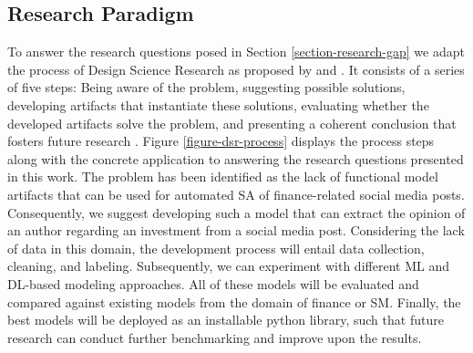 \subsection{Research Paradigm}

To answer the research questions posed in Section \ref{section-research-gap} we adapt the process of Design Science Research as proposed by  and . It consists of a series of five steps: Being aware of the problem, suggesting possible solutions, developing artifacts that instantiate these solutions, evaluating whether the developed artifacts solve the problem, and presenting a coherent conclusion that fosters future research \cite{kuechler2012dsrprocess}. Figure \ref{figure-dsr-process} displays the process steps along with the concrete application to answering the research questions presented in this work.\newline
The problem has been identified as the lack of functional model artifacts that can be used for automated SA of finance-related social media posts. Consequently, we suggest developing such a model that can extract the opinion of an author regarding an investment from a social media post. Considering the lack of data in this domain, the development process will entail data collection, cleaning, and labeling. Subsequently, we can experiment with different ML and DL-based modeling approaches. All of these models will be evaluated and compared against existing models from the domain of finance or SM. Finally, the best models will be deployed as an installable python library, such that future research can conduct further benchmarking and improve upon the results.











